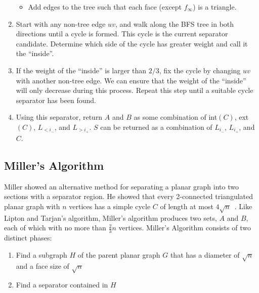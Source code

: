 \documentclass[12pt]{article}
\newtheorem{theorem}{Theorem}[section]
\begin{document}
\begin{enumerate}
\begin{itemize}
            \item Add edges to the tree such that each face (except $f_{\infty}$) is a triangle.
        \end{itemize}

        \item Start with any non-tree edge $uv$, and walk along the BFS tree in both directions until a cycle is formed. This cycle is the current separator candidate. Determine which side of the cycle has greater weight and call it the ``inside''.

        \item If the weight of the ``inside'' is larger than $2/3$, fix the cycle by changing $uv$ with another non-tree edge. We can ensure that the weight of the ``inside'' will only decrease during this process. Repeat this step until a suitable cycle separator has been found.

        \item Using this separator, return $A$ and $B$ as some combination of int$(C)$, ext$(C)$, $L_{< i_-}$, and $L_{> i_+}$. $S$ can be returned as a combination of $L_{i_-}$, $L_{i_+}$, and $C$.

    \end{enumerate}

    \subsection{Miller's Algorithm}
    \label{sec:graph-sep-miller}

    Miller showed an alternative method for separating a planar graph into two sections with a separator region. He showed that every 2-connected triangulated planar graph with $n$ vertices has a simple cycle $C$ of length at most $4\sqrt{n}$~\cite{miller1984finding}. Like Lipton and Tarjan's algorithm, Miller's algorithm produces two sets, $A$ and $B$, each of which with no more than $\frac{2}{3}n$ vertices. Miller's Algorithm consists of two distinct phases:
    \begin{enumerate}
      \item Find a subgraph $H$ of the parent planar graph $G$ that has a diameter of $\sqrt{n}$ and a face size of $\sqrt{n}$

      \item Find a separator contained in $H$
    \end{enumerate}

\end{document}
